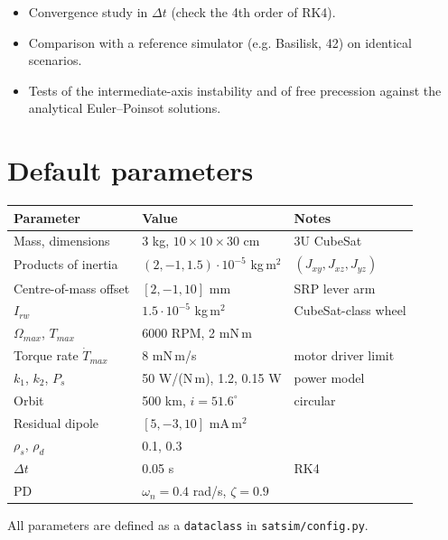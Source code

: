 \documentclass[11pt,a4paper]{article}
\newcommand{\code}[1]{\texttt{#1}}
\begin{document}
\begin{improvement}
\begin{itemize}[nosep]
  \item Convergence study in $\Delta t$ (check the 4th order of RK4).
  \item Comparison with a reference simulator (e.g. Basilisk, 42) on
        identical scenarios.
  \item Tests of the intermediate-axis instability and of free precession
        against the analytical Euler--Poinsot solutions.
\end{itemize}
\end{improvement}

\section{Default parameters}
\begin{center}
\begin{tabular}{lll}
\toprule
Parameter & Value & Notes\\
\midrule
Mass, dimensions & 3 kg, $10\times10\times30$ cm & 3U CubeSat\\
Products of inertia & $(2,-1,1.5)\cdot10^{-5}$ kg\,m$^2$ & $(J_{xy},J_{xz},J_{yz})$\\
Centre-of-mass offset & $[2,-1,10]$ mm & SRP lever arm\\
$I_{rw}$ & $1.5\cdot10^{-5}$ kg\,m$^2$ & CubeSat-class wheel\\
$\Omega_{max}$, $T_{max}$ & 6000 RPM, 2 mN\,m & \\
Torque rate $\dot T_{max}$ & 8 mN\,m/s & motor driver limit\\
$k_1$, $k_2$, $P_s$ & 50 W/(N\,m), 1.2, 0.15 W & power model\\
Orbit & 500 km, $i=51.6^\circ$ & circular\\
Residual dipole & $[5,-3,10]$ mA\,m$^2$ & \\
$\rho_s$, $\rho_d$ & 0.1, 0.3 & \\
$\Delta t$ & 0.05 s & RK4\\
PD & $\omega_n=0.4$ rad/s, $\zeta=0.9$ & \\
\bottomrule
\end{tabular}
\end{center}
All parameters are defined as a \code{dataclass} in \code{satsim/config.py}.
\end{document}
